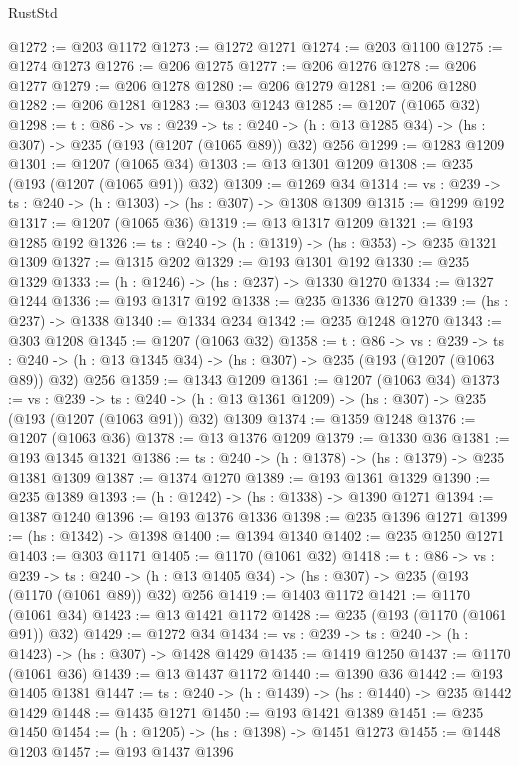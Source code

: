 \begin{lexlean}{RustStd}
\begin{coremodule}
{\begin{coremodule}
{{{{@1272 := @203 @1172
@1273 := @1272 @1271
@1274 := @203 @1100
@1275 := @1274 @1273
@1276 := @206 @1275
@1277 := @206 @1276
@1278 := @206 @1277
@1279 := @206 @1278
@1280 := @206 @1279
@1281 := @206 @1280
@1282 := @206 @1281
@1283 := @303 @1243
@1285 := @1207 (@1065 @32)
@1298 := {t : @86} ->
  {vs : @239} ->
  {ts : @240} -> (h : @13 @1285 @34) -> (hs : @307) -> @235 (@193 (@1207 (@1065 @89)) @32) @256
@1299 := @1283 @1209
@1301 := @1207 (@1065 @34)
@1303 := @13 @1301 @1209
@1308 := @235 (@193 (@1207 (@1065 @91)) @32)
@1309 := @1269 @34
@1314 := {vs : @239} -> {ts : @240} -> (h : @1303) -> (hs : @307) -> @1308 @1309
@1315 := @1299 @192
@1317 := @1207 (@1065 @36)
@1319 := @13 @1317 @1209
@1321 := @193 @1285 @192
@1326 := {ts : @240} -> (h : @1319) -> (hs : @353) -> @235 @1321 @1309
@1327 := @1315 @202
@1329 := @193 @1301 @192
@1330 := @235 @1329
@1333 := (h : @1246) -> (hs : @237) -> @1330 @1270
@1334 := @1327 @1244
@1336 := @193 @1317 @192
@1338 := @235 @1336 @1270
@1339 := (hs : @237) -> @1338
@1340 := @1334 @234
@1342 := @235 @1248 @1270
@1343 := @303 @1208
@1345 := @1207 (@1063 @32)
@1358 := {t : @86} ->
  {vs : @239} ->
  {ts : @240} -> (h : @13 @1345 @34) -> (hs : @307) -> @235 (@193 (@1207 (@1063 @89)) @32) @256
@1359 := @1343 @1209
@1361 := @1207 (@1063 @34)
@1373 := {vs : @239} ->
  {ts : @240} -> (h : @13 @1361 @1209) -> (hs : @307) -> @235 (@193 (@1207 (@1063 @91)) @32) @1309
@1374 := @1359 @1248
@1376 := @1207 (@1063 @36)
@1378 := @13 @1376 @1209
@1379 := @1330 @36
@1381 := @193 @1345 @1321
@1386 := {ts : @240} -> (h : @1378) -> (hs : @1379) -> @235 @1381 @1309
@1387 := @1374 @1270
@1389 := @193 @1361 @1329
@1390 := @235 @1389
@1393 := (h : @1242) -> (hs : @1338) -> @1390 @1271
@1394 := @1387 @1240
@1396 := @193 @1376 @1336
@1398 := @235 @1396 @1271
@1399 := (hs : @1342) -> @1398
@1400 := @1394 @1340
@1402 := @235 @1250 @1271
@1403 := @303 @1171
@1405 := @1170 (@1061 @32)
@1418 := {t : @86} ->
  {vs : @239} ->
  {ts : @240} -> (h : @13 @1405 @34) -> (hs : @307) -> @235 (@193 (@1170 (@1061 @89)) @32) @256
@1419 := @1403 @1172
@1421 := @1170 (@1061 @34)
@1423 := @13 @1421 @1172
@1428 := @235 (@193 (@1170 (@1061 @91)) @32)
@1429 := @1272 @34
@1434 := {vs : @239} -> {ts : @240} -> (h : @1423) -> (hs : @307) -> @1428 @1429
@1435 := @1419 @1250
@1437 := @1170 (@1061 @36)
@1439 := @13 @1437 @1172
@1440 := @1390 @36
@1442 := @193 @1405 @1381
@1447 := {ts : @240} -> (h : @1439) -> (hs : @1440) -> @235 @1442 @1429
@1448 := @1435 @1271
@1450 := @193 @1421 @1389
@1451 := @235 @1450
@1454 := (h : @1205) -> (hs : @1398) -> @1451 @1273
@1455 := @1448 @1203
@1457 := @193 @1437 @1396
}}}}
\end{coremodule}}
\end{coremodule}
\end{lexlean}
